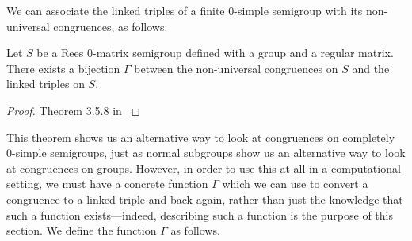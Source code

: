 We can associate the linked triples of a finite 0-simple semigroup with its
non-universal congruences, as follows.

\begin{theorem}
  \label{thm:linked-triple}
  Let $S$ be a Rees 0-matrix semigroup defined with a group and a regular
  matrix.  There exists a bijection $\Gamma$ between the non-universal
  congruences on $S$ and the linked triples on $S$.
  \begin{proof}
    Theorem 3.5.8 in \cite{howie}
  \end{proof}
\end{theorem}

This theorem shows us an alternative way to look at congruences on completely
0-simple semigroups, just as normal subgroups show us an alternative way to look
at congruences on groups.  However, in order to use this at all in a
computational setting, we must have a concrete function $\Gamma$ which we can
use to convert a congruence to a linked triple and back again, rather than just
the knowledge that such a function exists---indeed, describing such a function
is the purpose of this section.  We define the function $\Gamma$ as follows.

